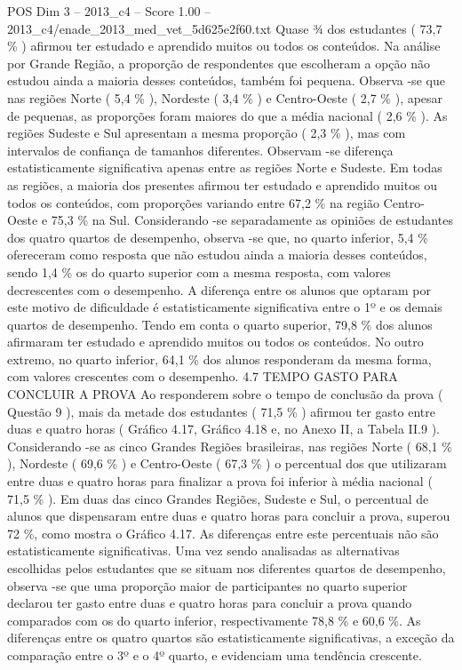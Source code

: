 \begin{textsample}{POS Dim 3 – 2013\_c4 – Score 1.00 – 2013\_c4/enade\_2013\_med\_vet\_5d625e2f60.txt}
Quase ¾ dos estudantes ( 73,7 \% ) afirmou ter estudado e aprendido muitos ou todos os conteúdos.
Na análise por Grande Região, a proporção de respondentes que escolheram a opção não estudou ainda a maioria desses conteúdos, também foi pequena.
Observa -se que nas regiões Norte ( 5,4 \% ), Nordeste ( 3,4 \% ) e Centro-Oeste ( 2,7 \% ), apesar de pequenas, as proporções foram maiores do que a média nacional ( 2,6 \% ).
As regiões Sudeste e Sul apresentam a mesma proporção ( 2,3 \% ), mas com intervalos de confiança de tamanhos diferentes.
Observam -se diferença estatisticamente significativa apenas entre as regiões Norte e Sudeste.
Em todas as regiões, a maioria dos presentes afirmou ter estudado e aprendido muitos ou todos os conteúdos, com proporções variando entre 67,2 \% na região Centro-Oeste e 75,3 \% na Sul.
Considerando -se separadamente as opiniões de estudantes dos quatro quartos de desempenho, observa -se que, no quarto inferior, 5,4 \% ofereceram como resposta que não estudou ainda a maioria desses conteúdos, sendo 1,4 \% os do quarto superior com a mesma resposta, com valores decrescentes com o desempenho.
A diferença entre os alunos que optaram por este motivo de dificuldade é estatisticamente significativa entre o 1º e os demais quartos de desempenho.
Tendo em conta o quarto superior, 79,8 \% dos alunos afirmaram ter estudado e aprendido muitos ou todos os conteúdos.
No outro extremo, no quarto inferior, 64,1 \% dos alunos responderam da mesma forma, com valores crescentes com o desempenho. 4.7 TEMPO GASTO PARA CONCLUIR A PROVA Ao responderem sobre o tempo de conclusão da prova ( Questão 9 ), mais da metade dos estudantes ( 71,5 \% ) afirmou ter gasto entre duas e quatro horas ( Gráfico 4.17, Gráfico 4.18 e, no Anexo II, a Tabela II.9 ).
Considerando -se as cinco Grandes Regiões brasileiras, nas regiões Norte ( 68,1 \% ), Nordeste ( 69,6 \% ) e Centro-Oeste ( 67,3 \% ) o percentual dos que utilizaram entre duas e quatro horas para finalizar a prova foi inferior à média nacional ( 71,5 \% ).
Em duas das cinco Grandes Regiões, Sudeste e Sul, o percentual de alunos que dispensaram entre duas e quatro horas para concluir a prova, superou 72 \%, como mostra o Gráfico 4.17.
As diferenças entre este percentuais não são estatisticamente significativas.
Uma vez sendo analisadas as alternativas escolhidas pelos estudantes que se situam nos diferentes quartos de desempenho, observa -se que uma proporção maior de participantes no quarto superior declarou ter gasto entre duas e quatro horas para concluir a prova quando comparados com os do quarto inferior, respectivamente 78,8 \% e 60,6 \%.
As diferenças entre os quatro quartos são estatisticamente significativas, a exceção da comparação entre o 3º e o 4º quarto, e evidenciam uma tendência crescente.

\end{textsample}
